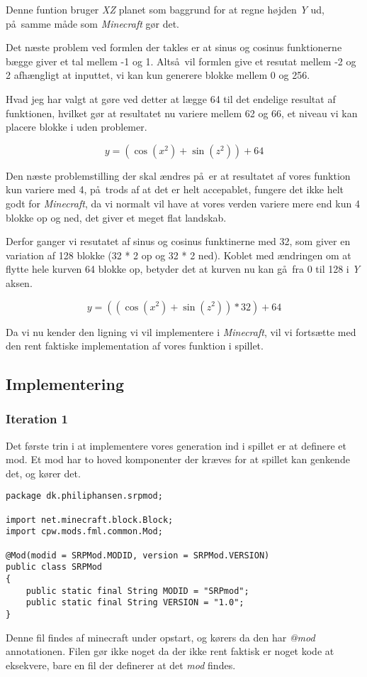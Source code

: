 \documentclass[a4paper,12pt]{report}
\begin{document}
		Denne funtion bruger \emph{XZ} planet som baggrund for at regne højden \emph{Y} ud,
		p\aa \ samme m\aa de som \emph{Minecraft} g\o r det.

		Det n\ae ste problem ved formlen der takles er at sinus og cosinus funktionerne b\ae gge giver et tal mellem -1 og 1.
		Alts\aa \ vil formlen give et resutat mellem -2 og 2 afh\ae ngligt at inputtet, vi kan kun generere blokke mellem
		0 og 256.

		Hvad jeg har valgt at g\o re ved detter at l\ae gge 64 til det endelige resultat af funktionen, hvilket g\o r at resultatet
		nu variere mellem 62 og 66, et niveau vi kan placere blokke i uden problemer.

		\[y = (\cos (x^2) + \sin (z^2)) + 64\]

		Den n\ae ste problemstilling der skal \ae ndres p\aa \ er at resultatet af vores funktion kun variere med 4, p\aa \
		trods af at det er helt accepablet, fungere det ikke helt godt for \emph{Minecraft}, da vi normalt vil have at vores verden
		variere mere end kun 4 blokke op og ned, det giver et meget flat landskab.

		Derfor ganger vi resutatet af sinus og cosinus funktinerne med 32, som giver en variation af 128 blokke (32 * 2 op og 32 * 2 ned).
		Koblet med \ae ndringen om at flytte hele kurven 64 blokke op, betyder det at kurven nu kan g\aa \ fra 0 til 128 i \emph{Y} aksen.

		\[y = ((\cos (x^2) + \sin (z^2)) * 32) + 64\]

		Da vi nu kender den ligning vi vil implementere i \emph{Minecraft}, vil vi forts\ae tte med den rent faktiske implementation af vores
		funktion i spillet.
	\subsection{Implementering}
		\subsubsection{Iteration 1}		
			Det f\o rste trin i at implementere vores generation ind i spillet er at definere et mod.
			Et mod har to hoved komponenter der kræves for at spillet kan genkende det, og k\o rer det.

\begin{lstlisting}[label=srpmod.java,caption=SRPMod.java]
package dk.philiphansen.srpmod;

import net.minecraft.block.Block;
import cpw.mods.fml.common.Mod;

@Mod(modid = SRPMod.MODID, version = SRPMod.VERSION)
public class SRPMod
{
    public static final String MODID = "SRPmod";
    public static final String VERSION = "1.0";
}
\end{lstlisting}
			Denne fil findes af minecraft under opstart, og k\o rers da den har \emph{@mod} annotationen.
			Filen g\o r ikke noget da der ikke rent faktisk er noget kode at eksekvere, bare en fil der definerer at det \emph{mod} findes.
\end{document}
